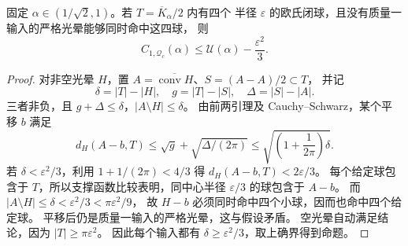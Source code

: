 \begin{proposition}[四邻域障碍的定量传递]\label{pb:quant-transfer}
固定 $\alpha\in(1/\sqrt2,1)$。若 $T=\overline K_\alpha/2$ 内有四个
半径 $\varepsilon$ 的欧氏闭球，且没有质量一输入的严格光晕能够同时命中这四球，
则
\[
 C_{1,\mathcal Q_c}(\alpha)\le\mathcal U(\alpha)-\frac{\varepsilon^2}{3}.
\]
\end{proposition}
\begin{proof}
对非空光晕 $H$，置 $A=\overline{\operatorname{conv}H}$、$S=(A-A)/2\subset T$，
并记
\[
 \delta=|T|-|H|,\quad g=|T|-|S|,\quad\Delta=|S|-|A|.
\]
三者非负，且 $g+\Delta\le\delta$，$|A\setminus H|\le\delta$。
由前两引理及 Cauchy--Schwarz，某个平移 $b$ 满足
\[
 d_H(A-b,T)\le\sqrt g+\sqrt{\Delta/(2\pi)}
 \le\sqrt{\left(1+\frac1{2\pi}\right)\delta}.
\]
若 $\delta<\varepsilon^2/3$，利用 $1+1/(2\pi)<4/3$ 得
$d_H(A-b,T)<2\varepsilon/3$。
每个给定球包含于 $T$，所以支撑函数比较表明，同中心半径
$\varepsilon/3$ 的球包含于 $A-b$。
而 $|A\setminus H|\le\delta<\varepsilon^2/3<\pi\varepsilon^2/9$，
故 $H-b$ 必须同时命中四个小球，因而也命中四个给定球。
平移后仍是质量一输入的严格光晕，这与假设矛盾。
空光晕自动满足结论，因为 $|T|\ge\pi\varepsilon^2$。
因此每个输入都有 $\delta\ge\varepsilon^2/3$，取上确界得到命题。
\end{proof}

